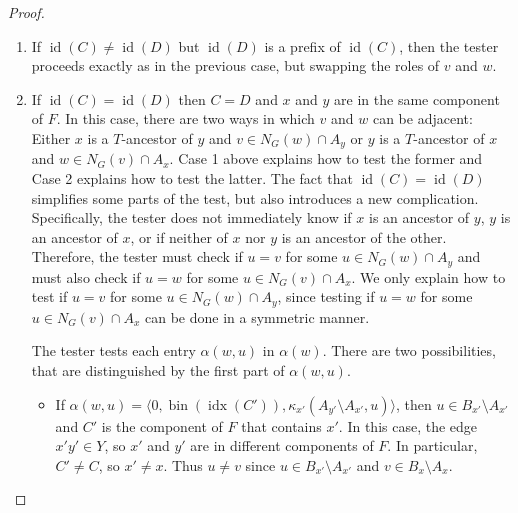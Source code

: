 \documentclass{patmorin}
\DeclareMathOperator{\id}{id}
\DeclareMathOperator{\bin}{bin}
\DeclareMathOperator{\idx}{idx}
\begin{document}
\begin{proof}
\begin{enumerate}
\begin{itemize}
      \item If $\alpha(w,u)=\langle 1, \bin(\idx(C')), \rho_{C'}(x'), \mu_{x'}(A_{y'}\setminus A_{x'}), \kappa_{x'}(A_{y'}\setminus A_{x'}, u)\rangle$, then $u\in B_{x'}\setminus A_{x'}$ and $C'$ is the component of $F$ that contains $x'$.  In this case, the first $\idx(C')$ parts of $\id(y)$ are $\id(C')$.  The tester computes $\id(x')=\id(C')\circ\rho_{C'}(x')$.  After doing this, the tester checks if $\id(x')=\id(x)$.  If not, then $x'\neq x$ and $u\neq v$ since $u\in B_{x'}\setminus A_{x'}$ and $v\in B_x\setminus A_x$. If $\id(x')=\id(x)$ then $x'=x$ since $\id$ is injective.  In this case, the tester can check if $u=v$ by checking if $I(\mu_{x'}(A_{y'}\setminus A_{x'}),\kappa_{x'}(A_{y'}\setminus A_{x'}, u), \mu_{x}(v))=1$ (the first and second arguments to $I(\cdot,\cdot,\cdot)$ come from $\alpha(w,u)$ and the third comes from $\ell(v)=\langle\id(x),\mu_x(v),\alpha(v)\rangle$).  If so, then $v=u\in N_G(w)$ so the tester outputs $A'(\ell(v),\ell(w)):=1$.  If not, the tester continues with the next entry (if any) in $\alpha(w)$. 
    \end{itemize}
    \item If $\id(C)\neq\id(D)$ but $\id(D)$ is a prefix of $\id(C)$, then the tester proceeds exactly as in the previous case, but swapping the roles of $v$ and $w$. 
    \item If $\id(C)=\id(D)$ then $C=D$ and $x$ and $y$ are in the same component of $F$.  In this case, there are two ways in which $v$ and $w$ can be adjacent:  Either $x$ is a $T$-ancestor of $y$ and $v\in N_G(w)\cap A_y$ or $y$ is a $T$-ancestor of $x$ and $w\in N_G(v)\cap A_x$.  Case 1 above explains how to test the former and Case 2 explains how to test the latter.
    The fact that $\id(C)=\id(D)$ simplifies some parts of the test, but also introduces a new complication.  Specifically, the tester does not immediately know if $x$ is an ancestor of $y$, $y$ is an ancestor of $x$, or if neither of $x$ nor $y$ is an ancestor of the other.  Therefore, the tester must check if $u=v$ for some $u\in N_G(w)\cap A_y$ and must also check if $u=w$ for some $u\in N_G(v)\cap A_x$. We only explain how to test if $u=v$ for some $u\in N_G(w)\cap A_y$, since testing if $u=w$ for some $u\in N_G(v)\cap A_x$ can be done in a symmetric manner.

    The tester tests each entry $\alpha(w,u)$ in $\alpha(w)$.  There are two possibilities, that are distinguished by the first part of $\alpha(w,u)$.

    \begin{itemize}
      \item If $\alpha(w,u)=\langle 0,\bin(\idx(C')), \kappa_{x'}(A_{y'}\setminus A_{x'}, u)\rangle$, then $u\in B_{x'}\setminus A_{x'}$ and $C'$ is the component of $F$ that contains $x'$.  In this case, the edge $x'y'\in Y$, so $x'$ and $y'$ are in different components of $F$.  In particular, $C'\neq C$, so $x'\neq x$.  Thus $u\neq v$ since $u\in B_{x'}\setminus A_{x'}$ and $v\in B_x\setminus A_x$.


\end{itemize}
\end{enumerate}
\end{proof}
\end{document}
